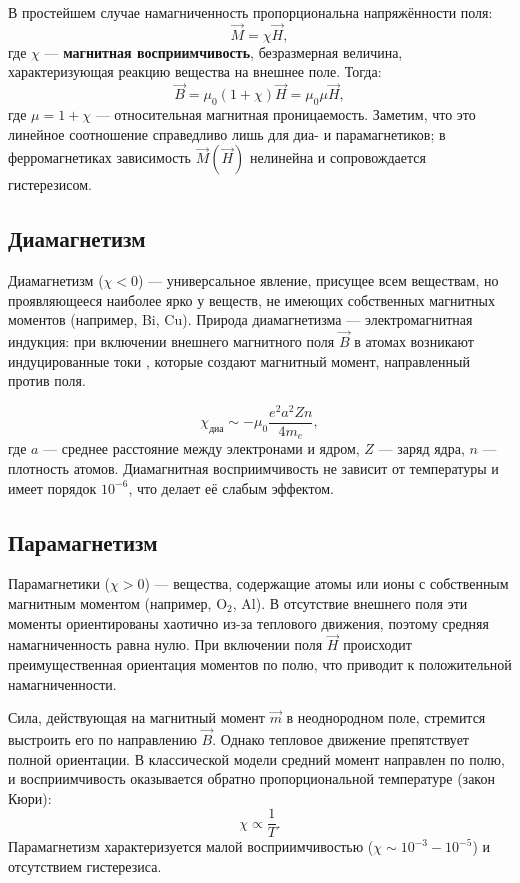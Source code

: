 \documentclass[a4paper]{article}
\begin{document}
В простейшем случае намагниченность пропорциональна напряжённости поля:
\begin{equation}
\vec{M} = \chi \vec{H},
\end{equation}
где $\chi$ — \textbf{магнитная восприимчивость}, безразмерная величина, характеризующая реакцию вещества на внешнее поле. Тогда:
\begin{equation}
\vec{B} = \mu_0 (1 + \chi)\vec{H} = \mu_0 \mu \vec{H},
\end{equation}
где $\mu = 1 + \chi$ — относительная магнитная проницаемость. Заметим, что это линейное соотношение справедливо лишь для диа- и парамагнетиков; в ферромагнетиках зависимость $\vec{M}(\vec{H})$ нелинейна и сопровождается гистерезисом.

\subsection*{Диамагнетизм}

Диамагнетизм ($\chi < 0$) — универсальное явление, присущее всем веществам, но проявляющееся наиболее ярко у веществ, не имеющих собственных магнитных моментов (например, Bi, Cu). Природа диамагнетизма — электромагнитная индукция: при включении внешнего магнитного поля $\vec{B}$ в атомах возникают индуцированные токи , которые создают магнитный момент, направленный против поля.

\begin{equation}
\chi_{\text{диа}} \sim -\mu_0 \frac{e^2 a^2 Z n}{4 m_e},
\end{equation}
где $a$ — среднее расстояние между электронами и ядром, $Z$ — заряд ядра, $n$ — плотность атомов. Диамагнитная восприимчивость не зависит от температуры и имеет порядок $10^{-6}$, что делает её слабым эффектом.

\subsection*{Парамагнетизм}

Парамагнетики ($\chi > 0$) — вещества, содержащие атомы или ионы с собственным магнитным моментом (например, O$_2$, Al). В отсутствие внешнего поля эти моменты ориентированы хаотично из-за теплового движения, поэтому средняя намагниченность равна нулю. При включении поля $\vec{H}$ происходит преимущественная ориентация моментов по полю, что приводит к положительной намагниченности.

Сила, действующая на магнитный момент $\vec{m}$ в неоднородном поле, стремится выстроить его по направлению $\vec{B}$. Однако тепловое движение препятствует полной ориентации. В классической модели средний момент направлен по полю, и восприимчивость оказывается обратно пропорциональной температуре (закон Кюри):
\begin{equation}
\chi \propto \frac{1}{T}.
\end{equation}
Парамагнетизм характеризуется малой восприимчивостью ($\chi \sim 10^{-3} - 10^{-5}$) и отсутствием гистерезиса.
\end{document}
